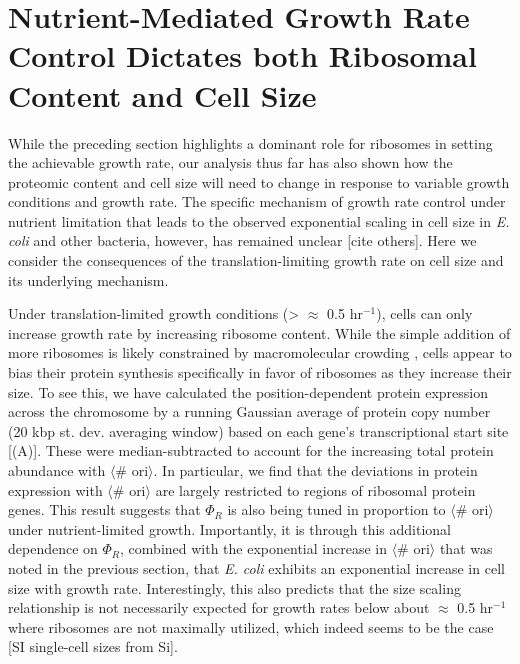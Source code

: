\section{Nutrient-Mediated Growth Rate Control Dictates both Ribosomal Content and Cell Size}
\label{sec:minimal_model}
While the preceding section highlights a dominant role for ribosomes in setting
the achievable growth rate, our analysis thus far has also shown how the
proteomic content and cell size will need to change in response to variable
growth conditions and growth rate. The specific mechanism of growth rate control
under nutrient limitation that leads to the observed exponential scaling in cell
size in \textit{E. coli} and other bacteria, however, has remained unclear
\citep{si2017}  [cite others]. Here we consider the consequences of the
translation-limiting growth rate on cell size and its underlying mechanism.

Under translation-limited growth conditions (> $\approx$ 0.5 hr$^{-1}$), cells can
only increase growth rate by increasing ribosome content. While the simple
addition of more ribosomes is likely constrained by macromolecular crowding
\citep{delarue2018, solerbistue2020}, cells appear to bias their protein
synthesis specifically in favor of ribosomes as they increase their size. To see
this, we have calculated the position-dependent protein expression across the
chromosome by a running Gaussian average of protein copy number (20 kbp st. dev.
averaging window) based on each gene's transcriptional start site
[(A)]. These were median-subtracted to account  for
the increasing total protein abundance with $\langle$\# ori$\rangle$. In
particular, we find that the deviations in protein expression with $\langle$\#
ori$\rangle$ are largely restricted to regions of ribosomal protein genes. This
result suggests that $\Phi_R$ is also being tuned in proportion to $\langle$\#
ori$\rangle$ under nutrient-limited growth. Importantly, it is through this
additional dependence on $\Phi_R$, combined with the exponential increase in
$\langle$\# ori$\rangle$ that was noted in the previous section, that \textit{E.
coli} exhibits an exponential increase in cell size with growth rate.
Interestingly, this also predicts that the size scaling relationship is not
necessarily expected for growth rates below about $\approx$ 0.5 hr$^{-1}$  where
ribosomes are not maximally utilized, which indeed seems to be the case [SI single-cell
sizes from Si].


